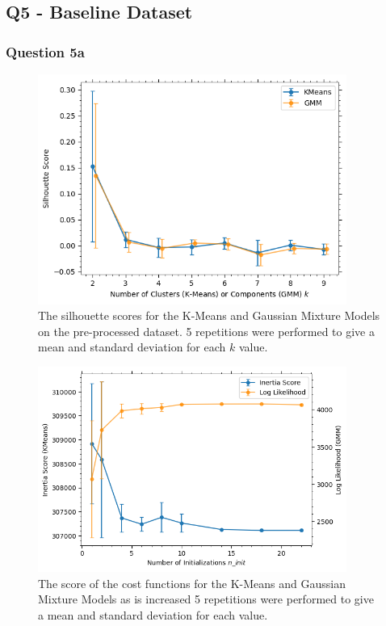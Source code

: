 
\subsection{Q5 - Baseline Dataset}\label{subsec:q5}
\subsubsection{Question 5a}\label{subsubsec:q5a}
    \begin{figure}[htb]
    \centering
    \includegraphics[width=0.9\textwidth]{./figures/q5a_silhouette_scores}
    \caption{The silhouette scores for the K-Means and Gaussian Mixture Models on the pre-processed
         dataset. 5 repetitions were performed to give a mean and standard deviation
        for each $k$ value.}
    \label{fig:q5a_silhouette_scores}
    \end{figure}

    \begin{figure}[htb]
    \centering
    \includegraphics[width=0.9\textwidth]{./figures/q5a_n_init_optimisation}
    \caption{The score of the cost functions for the K-Means and Gaussian Mixture Models as  is increased
        5 repetitions were performed to give a mean and standard deviation for each  value.}
    \label{fig:q5a_n_init_optimisation}
    \end{figure}

